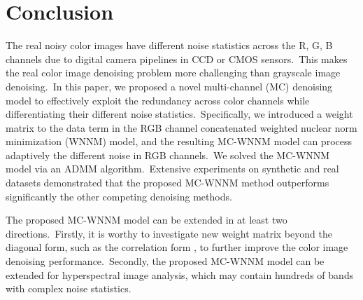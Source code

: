 \section{Conclusion}

The real noisy color images have different noise statistics across the R, G, B channels due to digital camera pipelines in CCD or CMOS sensors.\ This makes the real color image denoising problem more challenging than grayscale image denoising.\ In this paper, we proposed a novel multi-channel (MC) denoising model to effectively exploit the redundancy across color channels while differentiating their different noise statistics.\ Specifically, we introduced a weight matrix to the data term in the RGB channel concatenated weighted nuclear norm minimization (WNNM) model, and the resulting MC-WNNM model can process adaptively the different noise in RGB channels.\ We solved the MC-WNNM model via an ADMM algorithm.\ Extensive experiments on synthetic and real datasets demonstrated that the proposed MC-WNNM method outperforms significantly the other competing denoising methods.

The proposed MC-WNNM model can be extended in at least two directions.\ Firstly, it is worthy to investigate new weight matrix beyond the diagonal form, such as the correlation form \cite{nearcor}, to further improve the color image denoising performance.\ Secondly, the proposed MC-WNNM model can be extended for hyperspectral image analysis, which may contain hundreds of bands with complex noise statistics.